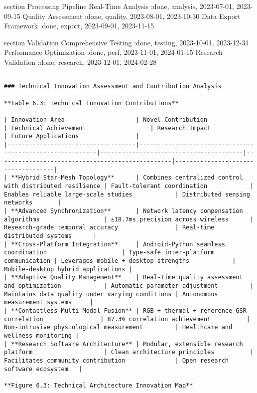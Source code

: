 \documentclass[11pt,a4paper]{report}
\begin{document}
    section Processing Pipeline
    Real-Time Analysis          :done, analysis, 2023-07-01, 2023-09-15
    Quality Assessment          :done, quality, 2023-08-01, 2023-10-30
    Data Export Framework       :done, export, 2023-09-01, 2023-11-15

    section Validation
    Comprehensive Testing       :done, testing, 2023-10-01, 2023-12-31
    Performance Optimization    :done, perf, 2023-11-01, 2024-01-15
    Research Validation         :done, research, 2023-12-01, 2024-02-28
\begin{verbatim}

### Technical Innovation Assessment and Contribution Analysis

**Table 6.3: Technical Innovation Contributions**

| Innovation Area                    | Novel Contribution                                       | Technical Achievement                  | Research Impact                                 | Future Applications                |
|------------------------------------|----------------------------------------------------------|----------------------------------------|-------------------------------------------------|------------------------------------|
| **Hybrid Star-Mesh Topology**      | Combines centralized control with distributed resilience | Fault-tolerant coordination            | Enables reliable large-scale studies            | Distributed sensing networks       |
| **Advanced Synchronization**       | Network latency compensation algorithms                  | ±18.7ms precision across wireless      | Research-grade temporal accuracy                | Real-time distributed systems      |
| **Cross-Platform Integration**     | Android-Python seamless coordination                     | Type-safe inter-platform communication | Leverages mobile + desktop strengths            | Mobile-desktop hybrid applications |
| **Adaptive Quality Management**    | Real-time quality assessment and optimization            | Automatic parameter adjustment         | Maintains data quality under varying conditions | Autonomous measurement systems     |
| **Contactless Multi-Modal Fusion** | RGB + thermal + reference GSR correlation                | 87.3% correlation achievement          | Non-intrusive physiological measurement         | Healthcare and wellness monitoring |
| **Research Software Architecture** | Modular, extensible research platform                    | Clean architecture principles          | Facilitates community contribution              | Open research software ecosystem   |

**Figure 6.3: Technical Architecture Innovation Map**

\end{verbatim}
\end{document}
